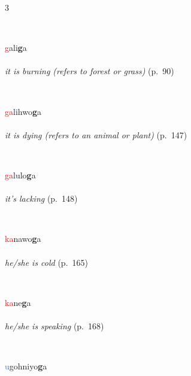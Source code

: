 \documentclass[oneside,openany]{book}%
\begin{document}
\begin{multicols}{3}
\begin{minipage}[t]{\linewidth}
\end{minipage}\\[1em]%
\begin{minipage}[t]{\linewidth}
\raggedright\noindent \textcolor{Red}{g}ali\textbf{g}a\\
\\
\noindent \textit{it is burning (refers to forest or grass)} (p.~90)
\end{minipage}\\[1em]%
\begin{minipage}[t]{\linewidth}
\raggedright\noindent \textcolor{Red}{ga}lihwo\textbf{g}a\\
\\
\noindent \textit{it is dying (refers to an animal or plant)} (p.~147)
\end{minipage}\\[1em]%
\begin{minipage}[t]{\linewidth}
\raggedright\noindent \textcolor{Red}{ga}lulo\textbf{g}a\\
\\
\noindent \textit{it's lacking} (p.~148)
\end{minipage}\\[1em]%
\begin{minipage}[t]{\linewidth}
\raggedright\noindent \textcolor{Red}{ka}nawo\textbf{g}a\\
\\
\noindent \textit{he/she is cold} (p.~165)
\end{minipage}\\[1em]%
\begin{minipage}[t]{\linewidth}
\raggedright\noindent \textcolor{Red}{ka}ne\textbf{g}a\\
\\
\noindent \textit{he/she is speaking} (p.~168)
\end{minipage}\\[1em]%
\begin{minipage}[t]{\linewidth}
\raggedright\noindent \textcolor{RoyalBlue}{u}gohniyo\textbf{g}a\\
\\

\end{minipage}
\end{multicols}
\end{document}
